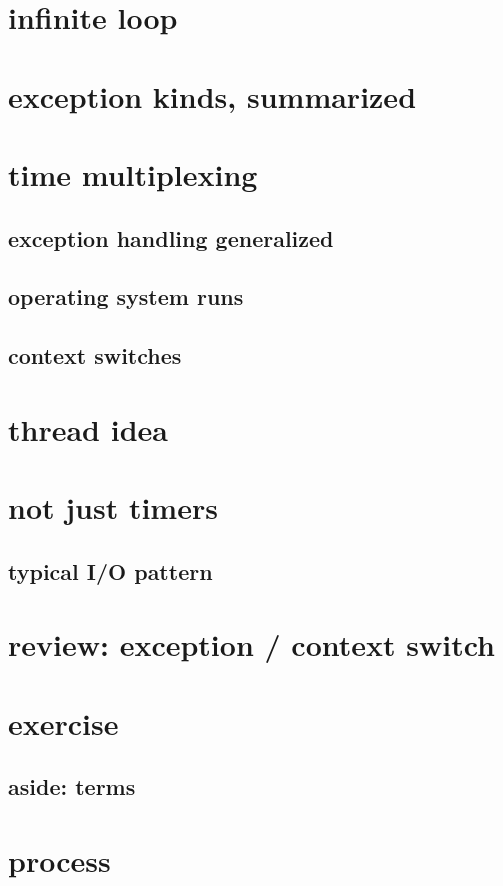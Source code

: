 \section{infinite loop}



\section{exception kinds, summarized}


\section{time multiplexing}


\subsection{exception handling generalized}


\subsection{operating system runs}


\subsection{context switches} 


\section{thread idea}


\section{not just timers}

\subsection{typical I/O pattern}




\section{review: exception / context switch}


\section{exercise}


\subsection{aside: terms}



\section{process}



